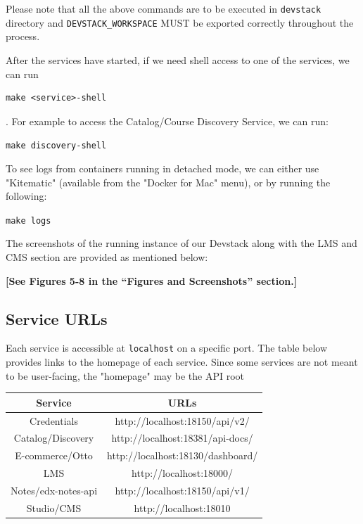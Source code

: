 Please note that all the above commands are to be executed in \verb=devstack= directory and \verb=DEVSTACK_WORKSPACE= MUST be exported correctly throughout the process.

After the services have started, if we need shell access to one of the services, we can run \begin{verbatim}make <service>-shell\end{verbatim}. For example to access the Catalog/Course Discovery Service, we can run:\newline
\begin{center}
\verb=make discovery-shell=
\end{center}
To see logs from containers running in detached mode, we can either use "Kitematic" (available
from the "Docker for Mac" menu), or by running the following:\newline
\begin{center}
\verb=make logs=
\end{center}
The screenshots of the running instance of our Devstack along with the LMS and CMS
section are provided as mentioned below:
\begin{center}
\textbf{[See Figures 5-8 in the “Figures and Screenshots” section.]}
\end{center}

\subsection{Service URLs}
Each service is accessible at \verb=localhost= on a specific port. The table below provides links
to the homepage of each service. Since some services are not meant to be user-facing, the
"homepage" may be the API root
\begin{center}
	\begin{tabular}{ |c|c| }
	\hline
	\textbf{Service} & \textbf{URLs} \\
	\hline
	Credentials & http://localhost:18150/api/v2/ \\
	Catalog/Discovery & http://localhost:18381/api-docs/ \\
	E-commerce/Otto & http://localhost:18130/dashboard/ \\
	LMS & http://localhost:18000/ \\
	Notes/edx-notes-api & http://localhost:18150/api/v1/ \\
	Studio/CMS & http://localhost:18010 \\
	\hline
	\end{tabular}
\end{center}

